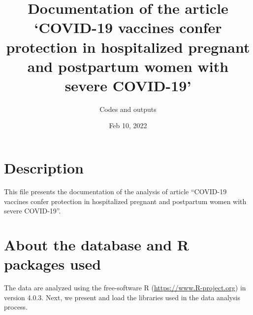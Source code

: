 \documentclass[
]{article}
\title{Documentation of the article `COVID-19 vaccines confer protection
in hospitalized pregnant and postpartum women with severe COVID-19'}
\author{Codes and outputs}
\date{Feb 10, 2022}
\begin{document}
\maketitle

{
\setcounter{tocdepth}{1}
\tableofcontents
}
\newpage

\hypertarget{description}{%
\section{Description}\label{description}}

This file presents the documentation of the analysis of article
``COVID-19 vaccines confer protection in hospitalized pregnant and
postpartum women with severe COVID-19''.

\hypertarget{about-the-database-and-r-packages-used}{%
\section{About the database and R packages
used}\label{about-the-database-and-r-packages-used}}

The data are analyzed using the free-software R
(\url{https://www.R-project.org}) in version 4.0.3. Next, we present and
load the libraries used in the data analysis process.
\end{document}
